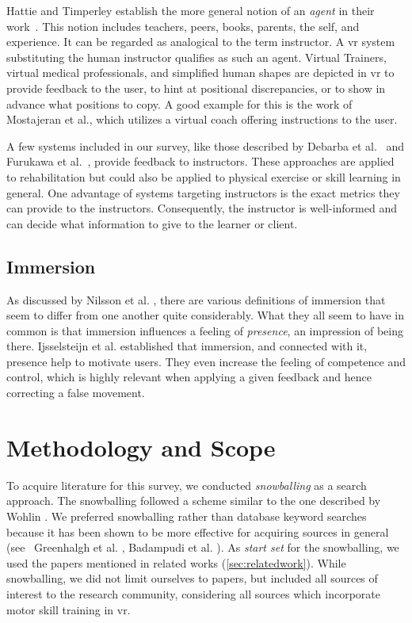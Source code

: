 Hattie and Timperley establish the more general notion of an \emph{agent} in their work~\cite{hattie:2007:Feedback}. This notion includes teachers, peers, books, parents, the self, and experience. It can be regarded as analogical to the term instructor. A \acrshort{vr} system substituting the human instructor qualifies as such an agent. Virtual Trainers, virtual medical professionals, and simplified human shapes are depicted in \acrshort{vr} to provide feedback to the user, to hint at positional discrepancies, or to show in advance what positions to copy. A good example for this is the work of Mostajeran et al.\cite{mostajeran2019hvc}, which utilizes a virtual coach offering instructions to the user.

A few systems included in our survey, like those described by Debarba et al.~\cite{debarba2018arv} and Furukawa et al.~\cite{furukawa2018dar}, provide feedback to instructors. These approaches are applied to rehabilitation but could also be applied to physical exercise or skill learning in general. One advantage of systems targeting instructors is the exact metrics they can provide to the instructors. Consequently, the instructor is well-informed and can decide what information to give to the learner or client.

\subsection{Immersion \label{sec:immersion}}
As discussed by Nilsson et al. \cite{Nilsson2016irr}, there are various definitions of immersion that seem to differ from one another quite considerably.
What they all seem to have in common is that immersion influences a feeling of \emph{presence}, an impression of being there. Ijsselsteijn et al. \cite{ijsselsteijn2004fas} established that immersion, and connected with it, presence help to motivate users. They even increase the feeling of competence and control, which is highly relevant when applying a given feedback and hence correcting a false movement.

\section{Methodology and Scope \label{sec:tvcg:methodology}}
To acquire literature for this survey, we conducted \emph{snowballing} as a search approach. The snowballing followed a scheme similar to the one described by Wohlin \cite{wohlin2014gss}. We preferred snowballing rather than database keyword searches because it has been shown to be more effective for acquiring sources in general (see \eg\ Greenhalgh et al. \cite{greenhalgh2005ees}, Badampudi et al. \cite{badampudi2015eus}). As \emph{start set} for the snowballing, we used the papers mentioned in related works (\autoref{sec:relatedwork}). While snowballing, we did not limit ourselves to papers, but included all sources of interest to the research community, considering all sources which incorporate motor skill training in \acrshort{vr}.

